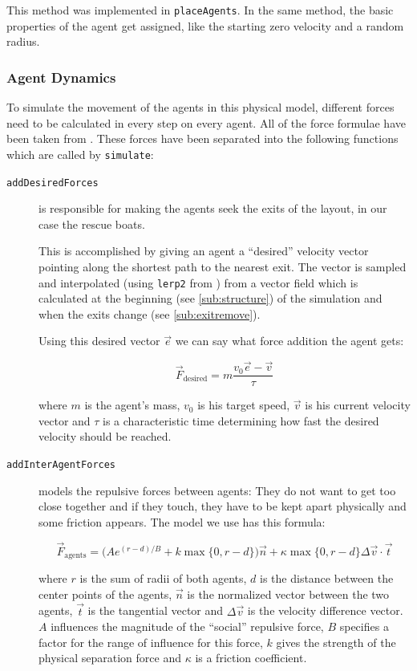 \documentclass[11pt]{article}
\begin{document}
This method was implemented in \texttt{placeAgents}.  In the same method, the
basic properties of the agent get assigned, like the starting zero velocity and
a random radius.

\subsubsection{Agent Dynamics}
\label{sub:movement}

To simulate the movement of the agents in this physical model, different forces
need to be calculated in every step on every agent.  All of the force formulae
have been taken from \cite{helbing}.  These forces have been separated into the
following functions which are called by \texttt{simulate}:

\begin{description}

\item[\texttt{addDesiredForces}] is responsible for making the agents seek the
exits of the layout, in our case the rescue boats.

This is accomplished by giving an agent a ``desired'' velocity vector pointing
along the shortest path to the nearest exit.  The vector is sampled and
interpolated (using \texttt{lerp2} from \cite{multilevel}) from a vector field
which is calculated at the beginning (see \ref{sub:structure}) of the
simulation and when the exits change (see \ref{sub:exitremove}).

Using this desired vector $\vec{e}$ we can say what force addition the agent gets:

\[ \vec{F}_\text{desired} = m \frac{v_0 \vec{e} - \vec{v}}{\tau} \]

where $m$ is the agent's mass, $v_0$ is his target speed, $\vec{v}$ is
his current velocity vector and $\tau$ is a characteristic time determining how
fast the desired velocity should be reached.

\item[\texttt{addInterAgentForces}] models the repulsive forces between agents:
They do not want to get too close together and if they touch, they have to be
kept apart physically and some friction appears.  The model we use has this
formula:

\[ \vec{F}_\text{agents} = \big(A e^{(r-d)/B} + k \max\{0, r-d\}\big) \vec{n} +
                     \kappa \max\{0, r-d\} \Delta \vec{v} \cdot \vec{t} \]

where $r$ is the sum of radii of both agents, $d$ is the distance between the
center points of the agents, $\vec{n}$ is the normalized vector between the two
agents, $\vec{t}$ is the tangential vector and $\Delta \vec{v}$ is the velocity
difference vector.  $A$ influences the magnitude of the ``social'' repulsive
force, $B$ specifies a factor for the range of influence for this force, $k$
gives the strength of the physical separation force and $\kappa$ is a friction
coefficient.


\end{description}
\end{document}
